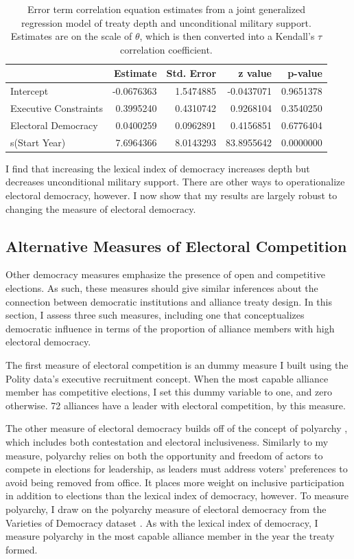 \documentclass[12pt]{article}
\begin{document}
\begin{table}[ht]
\centering
\begin{tabular}{lrrrr}
  \hline
 & Estimate & Std. Error & z value & p-value \\ 
  \hline
Intercept & -0.0676363 & 1.5474885 & -0.0437071 & 0.9651378 \\ 
  Executive Constraints & 0.3995240 & 0.4310742 & 0.9268104 & 0.3540250 \\ 
  Electoral Democracy & 0.0400259 & 0.0962891 & 0.4156851 & 0.6776404 \\ 
  s(Start Year) & 7.6964366 & 8.0143293 & 83.8955642 & 0.0000000 \\ 
   \hline
\end{tabular}
\caption{Error term correlation equation estimates from a joint generalized regression model of treaty depth and unconditional military support. 
                    Estimates are on the scale of $\theta$, which is then converted into a Kendall's $\tau$ correlation coefficient. 
                    } 
\label{tab:error-res}
\end{table}


I find that increasing the lexical index of democracy increases depth but decreases unconditional military support. 
There are other ways to operationalize electoral democracy, however. 
I now show that my results are largely robust to changing the measure of electoral democracy. 


\subsection{Alternative Measures of Electoral Competition}


Other democracy measures emphasize the presence of open and competitive elections. 
As such, these measures should give similar inferences about the connection between democratic institutions and alliance treaty design. 
In this section, I assess three such measures, including one that conceptualizes democratic influence in terms of the proportion of alliance members with high electoral democracy. 


The first measure of electoral competition is an dummy measure I built using the Polity data's executive recruitment concept.  
When the most capable alliance member has competitive elections, I set this dummy variable to one, and zero otherwise. 
72 alliances have a leader with electoral competition, by this measure. 


The other measure of electoral democracy builds off of the concept of polyarchy \citep{Dahl1971}, which includes both contestation and electoral inclusiveness. 
Similarly to my measure, polyarchy relies on both the opportunity and freedom of actors to compete in elections for leadership, as leaders must address voters' preferences to avoid being removed from office. 
It places more weight on inclusive participation in addition to elections than the lexical index of democracy, however. 
To measure polyarchy, I draw on the polyarchy measure of electoral democracy from the Varieties of Democracy dataset \citep{Teorelletal2016}.
As with the lexical index of democracy, I measure polyarchy in the most capable alliance member in the year the treaty formed.
\end{document}
